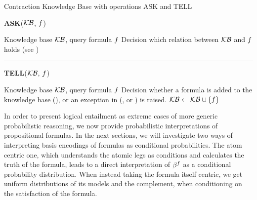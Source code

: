 \begin{algorithm}[hbt!]
    \caption{Contraction Knowledge Base with operations ASK and TELL}\label{alg:contractionKB}
    \vspace{0.3cm} \textbf{ASK}($\mathcal{KB}$, $f$)
    \begin{algorithmic}
    \iosepline
    \Require Knowledge base $\mathcal{KB}$, query formula $f$
    \Ensure Decision which relation between $\mathcal{KB}$ and $f$ holds (see )
    \iosepline
        \State{$\hypercoreat{\formulavar} \algdefsymbol \contractionof{\{\secexformulaat{\shortcatvariables} \wcols \secexformula\in\kb\},\bencodingofat{\exformula}{\formulavar,\shortcatvariables}}{\formulavar}$}
            \State \Return {}
            \State \Return {}
            \State \Return {}
        \Else
            \State \Return {}
        \EndIf
    \vspace{0.1cm}
    \hrule
    \end{algorithmic}
    \vspace{0.3cm} \textbf{TELL}($\mathcal{KB}$, $f$)
    \begin{algorithmic}
        \iosepline
    \Require Knowledge base $\mathcal{KB}$, query formula $f$
    \Ensure Decision whether a formula is added to the knowledge base (), or an exception in (,  or ) is raised.
    \iosepline
            \State \Return {}
            \State \Return {}
            \State \Return {}
            \State $\mathcal{KB} \leftarrow \mathcal{KB}\cup\{f\}$
            \State \Return {}
        \EndIf
    \end{algorithmic}

\end{algorithm}




In order to present logical entailment as extreme cases of more generic probabilistic reasoning, we now provide probabilistic interpretations of propositional formulas.
In the next sections, we will investigate two ways of interpreting basis encodings of formulas as conditional probabilities.
The atom centric one, which understands the atomic legs as conditions and calculates the truth of the formula, leads to a direct interpretation of $\beta^{f}$ as a conditional probability distribution.
When instead taking the formula itself centric, we get uniform distributions of its models and the complement, when conditioning on the satisfaction of the formula.

